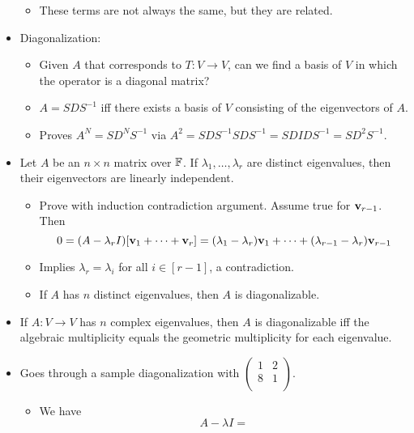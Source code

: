 \documentclass[../../notes.tex]{subfiles}
\begin{document}
\begin{itemize}
    \begin{itemize}
        \item These terms are not always the same, but they are related.
    \end{itemize}
    \item Diagonalization:
    \begin{itemize}
        \item Given $A$ that corresponds to $T:V\to V$, can we find a basis of $V$ in which the operator is a diagonal matrix?
        \item $A=SDS^{-1}$ iff there exists a basis of $V$ consisting of the eigenvectors of $A$.
        \item Proves $A^N=SD^NS^{-1}$ via $A^2=SDS^{-1}SDS^{-1}=SDIDS^{-1}=SD^2S^{-1}$.
    \end{itemize}
    \item Let $A$ be an $n\times n$ matrix over $\mathbb{F}$. If $\lambda_1,\dots,\lambda_r$ are distinct eigenvalues, then their eigenvectors are linearly independent.
    \begin{itemize}
        \item Prove with induction contradiction argument. Assume true for $\mathbf{v}_{r-1}$. Then
        \begin{equation*}
            0 = (A-\lambda_rI)[\mathbf{v}_1+\cdots+\mathbf{v}_r] = (\lambda_1-\lambda_r)\mathbf{v}_1+\cdots+(\lambda_{r-1}-\lambda_r)\mathbf{v}_{r-1}
        \end{equation*}
        \item Implies $\lambda_r=\lambda_i$ for all $i\in[r-1]$, a contradiction.
        \item If $A$ has $n$ distinct eigenvalues, then $A$ is diagonalizable.
    \end{itemize}
    \item If $A:V\to V$ has $n$ complex eigenvalues, then $A$ is diagonalizable iff the algebraic multiplicity equals the geometric multiplicity for each eigenvalue.
    \item Goes through a sample diagonalization with $
        \left(
            \begin{smallmatrix}
                1 & 2\\
                8 & 1\\
            \end{smallmatrix}
        \right)
    $.
    \begin{itemize}
        \item We have
        \begin{equation*}
            A-\lambda I =

\end{equation*}
\end{itemize}
\end{itemize}
\end{document}
